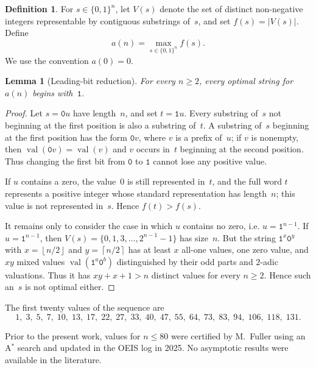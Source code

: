 \documentclass[11pt,a4paper]{article}
\theoremstyle{plain}
\newtheorem{lemma}[theorem]{Lemma}
\theoremstyle{definition}
\newtheorem{definition}[theorem]{Definition}
\theoremstyle{remark}
\newcommand{\floor}[1]{\left\lfloor #1 \right\rfloor}
\newcommand{\ceil}[1]{\left\lceil #1 \right\rceil}
\newcommand{\val}{\operatorname{val}}
\begin{document}
\begin{definition}\label{def:main}
  For $s \in \{0,1\}^n$, let $V(s)$ denote the set of distinct
  non-negative integers representable by contiguous substrings of~$s$,
  and set $f(s) = |V(s)|$.  Define
  \[
    a(n) = \max_{s \in \{0,1\}^n} f(s).
  \]
  We use the convention $a(0) = 0$.
\end{definition}

\begin{lemma}[Leading-bit reduction]\label{lem:leading-bit}
  For every $n \ge 2$, every optimal string for $a(n)$ begins
  with~$\mathtt{1}$.
\end{lemma}

\begin{proof}
  Let $s = \mathtt{0}u$ have length~$n$, and set
  $t = \mathtt{1}u$.  Every substring of~$s$ not beginning at the
  first position is also a substring of~$t$.  A substring of~$s$
  beginning at the first position has the form $\mathtt{0}v$, where
  $v$ is a prefix of~$u$; if $v$ is nonempty, then
  $\val(\mathtt{0}v) = \val(v)$ and $v$ occurs in~$t$ beginning at
  the second position.  Thus changing the first bit from
  $\mathtt{0}$ to $\mathtt{1}$ cannot lose any positive value.

  If $u$ contains a zero, the value~$0$ is still represented in~$t$,
  and the full word $t$ represents a positive integer whose standard
  representation has length~$n$; this value is not represented in~$s$.
  Hence $f(t) > f(s)$.

  It remains only to consider the case in which $u$ contains no zero,
  i.e. $u = \mathtt{1}^{n-1}$.
  If $u = \mathtt{1}^{n-1}$, then
  $V(s) = \{0,1,3,\ldots,2^{n-1}-1\}$ has size~$n$.  But
  the string $\mathtt{1}^{x}\mathtt{0}^{y}$ with
  $x=\floor{n/2}$ and $y=\ceil{n/2}$ has at least $x$ all-one
  values, one zero value, and $xy$ mixed values
  $\val(\mathtt{1}^a\mathtt{0}^b)$ distinguished by their odd parts
  and $2$-adic valuations.  Thus it has
  $xy+x+1>n$ distinct values for every $n\ge2$.  Hence
  such an~$s$ is not optimal either.
\end{proof}

The first twenty values of the sequence are
\[
  1,\; 3,\; 5,\; 7,\; 10,\; 13,\; 17,\; 22,\; 27,\; 33,\;
  40,\; 47,\; 55,\; 64,\; 73,\; 83,\; 94,\; 106,\; 118,\; 131.
\]

Prior to the present work, values for $n \le 80$ were certified by
M.~Fuller using an A$^*$ search and updated in the OEIS log in 2025.
No asymptotic results were available in the literature.
\end{document}
